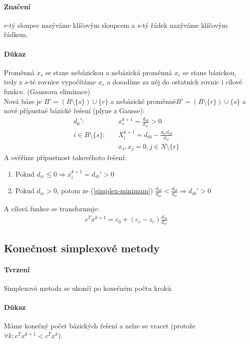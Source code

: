\documentclass[a4paper,12pt,titlepage]{article}
\begin{document}
\paragraph{Značení}
$r$-tý sloupec nazýváme klíčovým sloupcem a $s$-tý řádek nazýváme klíčovým řádkem.
\paragraph{Důkaz}
Proměnná $x_s$ se stane nebázickou a nebázická proměnná $x_r$ se stane bázickou,
tedy z $s$-té rovnice vypočítáme $x_r$ a dosadíme za něj do ostatních rovnic i
cílové funkce. (Gaussova eliminace) \\
Nová báze je $B' = (B \setminus \{s\}) \cup \{r\}$ a nebázické proměnné$B' = (B
\setminus \{r\}) \cup \{s\}$ a nové přípustné bázické řešení (plyne z Gausse):
\begin{align}
	d_0': \quad&x_r^{k+1} = \frac{d_{s0}}{d_{sr}} > 0\\
	i \in B \setminus \{s\}: \quad&X_i^{k+1} = d_{i0} - \frac{d_{ir}d_{s0}}{d_{sr}} \\
	&x_s, x_j = 0, j \in N \setminus \{r\}
\end{align}
A ověříme přípustnost takovéhoto řešení:
\begin{enumerate}
	\item Pokud $d_{ir} \le 0 \Rightarrow x_i^{k+1} = d_{i0}' > 0$
	\item Pokud $d_{ir} > 0$, potom ze (\ref{simplex-minimum})
	$\frac{d_{s0}}{d_{sr}} < \frac{d_{i0}}{d_{ir}} \Rightarrow d_{i0}' > 0$ 
\end{enumerate}
A cílová funkce se transformuje:
\begin{align}
	c^Tx^{k+1} = c_0 + (c_r - z_r) \frac{d_{s0}}{d_{sr}}
\end{align}


\subsection{Konečnost simplexové metody}
\setcounter{equation}{0}
\paragraph{Tvrzení}
Simplexová metoda se ukončí po konečném počtu kroků.
\paragraph{Důkaz}
Máme konečný počet bázických řešení a nelze se vracet (protože $\forall k: c^T
x^{k+1} < c^T x^k$).
\end{document}
